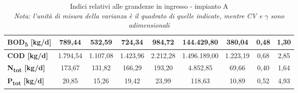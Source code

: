 \begin{sidewaystable}[h]
\begin{center}
\begin{tabular}{l|c|c|c|c|c|c|c|c|}
		\multicolumn{1}{|l|}{\textbf{BOD\textsubscript{5} {[}kg/d{]}}}          & 789,44                    & 532,59                    & 724,34                    & 984,72                    & 144.429,80                  & 380,04                      & 0,48                      & 1,30                      \\ \hline
		\multicolumn{1}{|l|}{\textbf{COD {[}kg/d{]}}}           & 1.794,54                   & 1.107,08                  & 1.423,96                  & 2.212,28                  & 1.496.189,00                   & 1.223,19                    & 0,68                      & 2,85                      \\ \hline
		\multicolumn{1}{|l|}{\textbf{N\textsubscript{tot} {[}kg/d{]}}}          & 173,67                    & 131,82                    & 166,29                    & 193,20                     & 4.852,85                    & 69,66                       & 0,40                      & 1,64                      \\ \hline
		\multicolumn{1}{|l|}{\textbf{P\textsubscript{tot} {[}kg/d{]}}}          & 20,85                     & 15,26                     & 19,42                     & 23,99                     & 118,63                      & 10,89                       & 0,52                      & 4,93                      \\ \hline
	\end{tabular}
	\end{center}
	\caption{Indici relativi alle grandezze in ingresso - impianto A\\ \textit{Nota: l'unità di misura della varianza è il quadrato di quelle indicate, mentre CV e $\gamma$ sono adimensionali}}
	\label{tab:sa_indici_in}
\end{sidewaystable}


